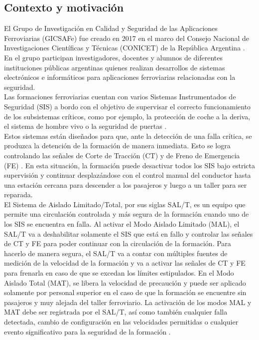 



\subsection{Contexto y motivación}

El Grupo de Investigación en Calidad y Seguridad de las Aplicaciones Ferroviarias (GICSAFe) fue creado en 2017 en el marco del Consejo Nacional de Investigaciones Científicas y Técnicas (CONICET) de la República Argentina \cite{gicsafe}. En el grupo participan investigadores, docentes y alumnos de diferentes instituciones públicas argentinas quienes realizan desarrollos de sistemas electrónicos e informáticos para aplicaciones ferroviarias relacionadas con la seguridad. \\

Las formaciones ferroviarias cuentan con varios Sistemas Instrumentados de Seguridad (SIS) a bordo con el objetivo de supervisar el correcto funcionamiento de los subsistemas críticos, como por ejemplo, la protección de coche a la deriva, el sistema de hombre vivo o la seguridad de puertas \cite{salt_paper}. \\

Estos sistemas están diseñados para que, ante la detección de una falla crítica, se produzca la detención de la formación de manera inmediata. Esto se logra controlando las señales de Corte de Tracción (CT) y de Freno de Emergencia (FE) \cite{salt_paper}. En esta situación, la formación puede desactivar todos los SIS bajo estricta supervisión y continuar desplazándose con el control manual del conductor hasta una estación cercana para descender a los pasajeros y luego a un taller para ser reparada. \\

El Sistema de Aislado Limitado/Total, por sus siglas SAL/T, es un equipo que permite una circulación controlada y más segura de la formación cuando uno de los SIS se encuentra en falla. Al activar el Modo Aislado Limitado (MAL), el SAL/T va a deshabilitar solamente el SIS que está en fallo y controlar las señales de CT y FE para poder continuar con la circulación de la formación. Para hacerlo de manera segura, el SAL/T va a contar con múltiples fuentes de medición de la velocidad de la formación y va a activar las señales de CT y FE para frenarla en caso de que se excedan los límites estipulados. En el Modo Aislado Total (MAT), se libera la velocidad de precaución y puede ser aplicado solamente por personal superior en el caso de que la formación se encuentre sin pasajeros y muy alejada del taller ferroviario. La activación de los modos MAL y MAT debe ser registrada por el SAL/T, así como también cualquier falla detectada, cambio de configuración en las velocidades permitidas o cualquier evento significativo para la seguridad de la formación \cite{salt_paper}.\\

